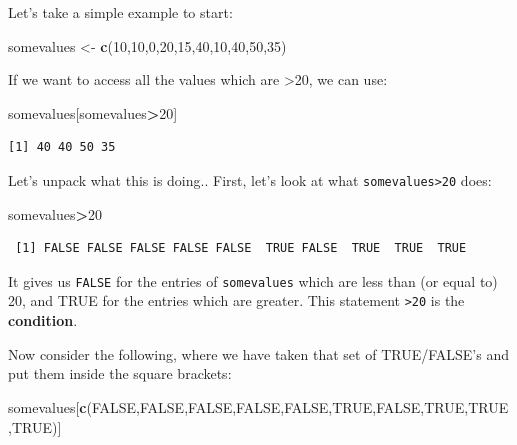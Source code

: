 \documentclass[]{book}
\newenvironment{Shaded}{\begin{snugshade}}{\end{snugshade}}
\newcommand{\DecValTok}[1]{\textcolor[rgb]{0.00,0.00,0.81}{#1}}
\newcommand{\KeywordTok}[1]{\textcolor[rgb]{0.13,0.29,0.53}{\textbf{#1}}}
\newcommand{\NormalTok}[1]{#1}
\newcommand{\OperatorTok}[1]{\textcolor[rgb]{0.81,0.36,0.00}{\textbf{#1}}}
\newcommand{\OtherTok}[1]{\textcolor[rgb]{0.56,0.35,0.01}{#1}}
\newcommand{\StringTok}[1]{\textcolor[rgb]{0.31,0.60,0.02}{#1}}
\begin{document}
Let's take a simple example to start:

\begin{Shaded}
\begin{Highlighting}[]
\NormalTok{somevalues <-}\StringTok{ }\KeywordTok{c}\NormalTok{(}\DecValTok{10}\NormalTok{,}\DecValTok{10}\NormalTok{,}\DecValTok{0}\NormalTok{,}\DecValTok{20}\NormalTok{,}\DecValTok{15}\NormalTok{,}\DecValTok{40}\NormalTok{,}\DecValTok{10}\NormalTok{,}\DecValTok{40}\NormalTok{,}\DecValTok{50}\NormalTok{,}\DecValTok{35}\NormalTok{)}
\end{Highlighting}
\end{Shaded}

If we want to access all the values which are \textgreater{}20, we can use:

\begin{Shaded}
\begin{Highlighting}[]
\NormalTok{somevalues[somevalues}\OperatorTok{>}\DecValTok{20}\NormalTok{]}
\end{Highlighting}
\end{Shaded}

\begin{verbatim}
[1] 40 40 50 35
\end{verbatim}

Let's unpack what this is doing..
First, let's look at what \texttt{somevalues\textgreater{}20} does:

\begin{Shaded}
\begin{Highlighting}[]
\NormalTok{somevalues}\OperatorTok{>}\DecValTok{20}
\end{Highlighting}
\end{Shaded}

\begin{verbatim}
 [1] FALSE FALSE FALSE FALSE FALSE  TRUE FALSE  TRUE  TRUE  TRUE
\end{verbatim}

It gives us \texttt{FALSE} for the entries of \texttt{somevalues} which are less than (or equal to) 20, and TRUE for the entries which are greater.
This statement \texttt{\textgreater{}20} is the \textbf{condition}.

Now consider the following, where we have taken that set of TRUE/FALSE's and put them inside the square brackets:

\begin{Shaded}
\begin{Highlighting}[]
\NormalTok{somevalues[}\KeywordTok{c}\NormalTok{(}\OtherTok{FALSE}\NormalTok{,}\OtherTok{FALSE}\NormalTok{,}\OtherTok{FALSE}\NormalTok{,}\OtherTok{FALSE}\NormalTok{,}\OtherTok{FALSE}\NormalTok{,}\OtherTok{TRUE}\NormalTok{,}\OtherTok{FALSE}\NormalTok{,}\OtherTok{TRUE}\NormalTok{,}\OtherTok{TRUE}\NormalTok{,}\OtherTok{TRUE}\NormalTok{)]}
\end{Highlighting}
\end{Shaded}
\end{document}
